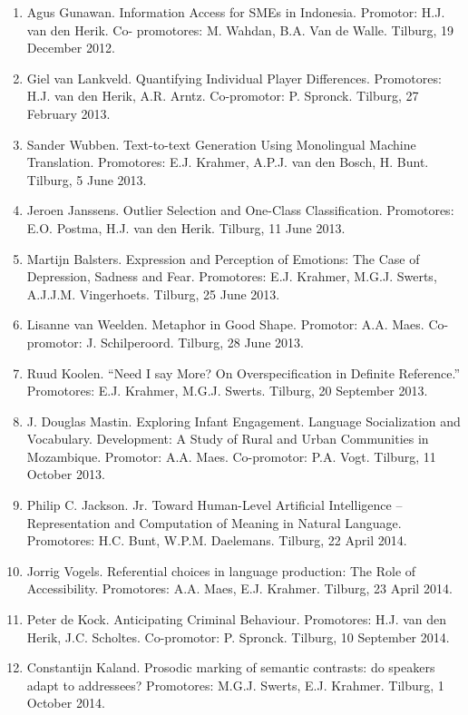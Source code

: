 \begin{enumerate}
\item{ Agus Gunawan. Information Access for SMEs in Indonesia. Promotor: H.J.  
van den Herik. Co-
promotores: M. Wahdan, B.A. Van de Walle. Tilburg, 19 December 2012.}

\item{ Giel van Lankveld. Quantifying Individual Player Differences.  
Promotores: H.J. van den Herik,
A.R. Arntz. Co-promotor: P. Spronck. Tilburg, 27 February 2013.}

\item{ Sander Wubben. Text-to-text Generation Using Monolingual Machine 
Translation.  Promotores:
E.J. Krahmer, A.P.J. van den Bosch, H. Bunt. Tilburg, 5 June 2013.}
\item{ Jeroen Janssens. Outlier Selection and One-Class Classification.  
Promotores: E.O. Postma, H.J.
van den Herik. Tilburg, 11 June 2013.}
\item{ Martijn Balsters. Expression and Perception of Emotions: The Case of 
Depression, Sadness and
Fear. Promotores: E.J. Krahmer, M.G.J. Swerts, A.J.J.M. Vingerhoets. Tilburg, 
25 June 2013.}
\item{ Lisanne van Weelden. Metaphor in Good Shape. Promotor: A.A. Maes.  
Co-promotor:
J. Schilperoord. Tilburg, 28 June 2013.}
\item{ Ruud Koolen. “Need I say More? On Overspecification in Definite 
Reference.” Promotores: E.J.
Krahmer, M.G.J. Swerts. Tilburg, 20 September 2013.}
\item{ J. Douglas Mastin. Exploring Infant Engagement. Language Socialization 
and Vocabulary.
Development: A Study of Rural and Urban Communities in Mozambique. Promotor: A.A. Maes.
Co-promotor: P.A. Vogt. Tilburg, 11 October 2013.}
\item{ Philip C. Jackson. Jr. Toward Human-Level Artificial Intelligence – 
Representation and
Computation of Meaning in Natural Language. Promotores: H.C. Bunt, W.P.M. Daelemans.
Tilburg, 22 April 2014.}
\item{ Jorrig Vogels. Referential choices in language production: The Role of 
Accessibility. Promotores:
A.A. Maes, E.J. Krahmer. Tilburg, 23 April 2014.}
\item{ Peter de Kock. Anticipating Criminal Behaviour. Promotores: H.J. van den 
Herik, J.C. Scholtes.
Co-promotor: P. Spronck. Tilburg, 10 September 2014.}
\item{ Constantijn Kaland. Prosodic marking of semantic contrasts: do speakers 
adapt to addressees?
Promotores: M.G.J. Swerts, E.J. Krahmer. Tilburg, 1 October 2014.}

\end{enumerate}
